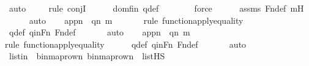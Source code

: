 \begin{isabellebody}
\ auto{\isacharbrackleft}{\kern0pt}{}{\isacharbrackright}{\kern0pt}\isanewline
\ \ \ \ \isamarkupfalse%
{\isacharparenleft}{\kern0pt}rule\ conjI{\isacharparenright}{\kern0pt}\isanewline
\ \ \ \ \isamarkupfalse%
\ domfin\ q{\isacharunderscore}{\kern0pt}def\ \isanewline
\ \ \ \ \ \isamarkupfalse%
\ force\isanewline
\ \ \ \ \isamarkupfalse%
\ assms\ Fn{\isacharunderscore}{\kern0pt}def\ mH\isanewline
\ \ \ \ \isamarkupfalse%
\ auto\isanewline
\isanewline
\ \ \isamarkupfalse%
\ appn\ {\isacharcolon}{\kern0pt}\ {\isachardoublequoteopen}q{\isacharbackquote}{\kern0pt}{\isacharless}{\kern0pt}n{\isacharcomma}{\kern0pt}\ m{\isachargreater}{\kern0pt}\ {\isacharequal}{\kern0pt}\ {}{\isachardoublequoteclose}\isanewline
\ \ \ \ \isamarkupfalse%
{\isacharparenleft}{\kern0pt}rule\ function{\isacharunderscore}{\kern0pt}apply{\isacharunderscore}{\kern0pt}equality{\isacharparenright}{\kern0pt}\isanewline
\ \ \ \ \isamarkupfalse%
\ q{\isacharunderscore}{\kern0pt}def\ qinFn\ Fn{\isacharunderscore}{\kern0pt}def\ \isanewline
\ \ \ \ \isamarkupfalse%
\ auto\isanewline
\isanewline
\ \ \isamarkupfalse%
\ appn{\isacharprime}{\kern0pt}\ {\isacharcolon}{\kern0pt}\ {\isachardoublequoteopen}q{\isacharbackquote}{\kern0pt}{\isacharless}{\kern0pt}n{\isacharprime}{\kern0pt}{\isacharcomma}{\kern0pt}\ m{\isachargreater}{\kern0pt}\ {\isacharequal}{\kern0pt}\ {}{\isachardoublequoteclose}\ \isanewline
\ \ \ \ \isamarkupfalse%
{\isacharparenleft}{\kern0pt}rule\ function{\isacharunderscore}{\kern0pt}apply{\isacharunderscore}{\kern0pt}equality{\isacharparenright}{\kern0pt}\isanewline
\ \ \ \ \isamarkupfalse%
\ q{\isacharunderscore}{\kern0pt}def\ qinFn\ Fn{\isacharunderscore}{\kern0pt}def\ \isanewline
\ \ \ \ \isamarkupfalse%
\ auto\ \ \ \ \isanewline
\isanewline
\ \ \isamarkupfalse%
\ listin\ {\isacharcolon}{\kern0pt}\ {\isachardoublequoteopen}{\isacharbrackleft}{\kern0pt}binmap{\isacharunderscore}{\kern0pt}row{\isacharprime}{\kern0pt}{\isacharparenleft}{\kern0pt}n{\isacharparenright}{\kern0pt}{\isacharcomma}{\kern0pt}\ binmap{\isacharunderscore}{\kern0pt}row{\isacharprime}{\kern0pt}{\isacharparenleft}{\kern0pt}n{\isacharprime}{\kern0pt}{\isacharparenright}{\kern0pt}{\isacharbrackright}{\kern0pt}\ {\isasymin}\ list{\isacharparenleft}{\kern0pt}HS{\isacharparenright}{\kern0pt}{\isachardoublequoteclose}\ \isanewline
\ \ \ \ \isamarkupfalse%

\end{isabellebody}
